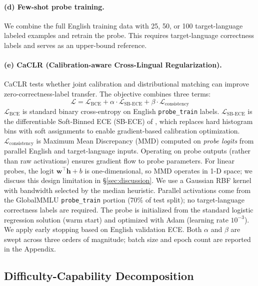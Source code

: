 \paragraph{(d) Few-shot probe training.} We combine the full English training data with 25, 50, or 100 target-language labeled examples and retrain the probe. This requires target-language correctness labels and serves as an upper-bound reference.

\paragraph{(e) CaCLR (Calibration-aware Cross-Lingual Regularization).} CaCLR tests whether joint calibration and distributional matching can improve zero-correctness-label transfer. The objective combines three terms:
\begin{equation}
  \mathcal{L} = \mathcal{L}_{\text{BCE}} + \alpha \cdot \mathcal{L}_{\text{SB-ECE}} + \beta \cdot \mathcal{L}_{\text{consistency}}
  \label{eq:caclr}
\end{equation}
$\mathcal{L}_{\text{BCE}}$ is standard binary cross-entropy on English \texttt{probe\_train} labels. $\mathcal{L}_{\text{SB-ECE}}$ is the differentiable Soft-Binned ECE (SB-ECE) of \citet{karandikar2021sbece}, which replaces hard histogram bins with soft assignments to enable gradient-based calibration optimization. $\mathcal{L}_{\text{consistency}}$ is Maximum Mean Discrepancy (MMD) computed on \emph{probe logits} from parallel English and target-language inputs. Operating on probe outputs (rather than raw activations) ensures gradient flow to probe parameters. For linear probes, the logit $\mathbf{w}^\top \mathbf{h} + b$ is one-dimensional, so MMD operates in 1-D space; we discuss this design limitation in \S\ref{sec:discussion}. We use a Gaussian RBF kernel with bandwidth selected by the median heuristic. Parallel activations come from the GlobalMMLU \texttt{probe\_train} portion (70\% of test split); no target-language correctness labels are required. The probe is initialized from the standard logistic regression solution (warm start) and optimized with Adam (learning rate $10^{-3}$). We apply early stopping based on English validation ECE. Both $\alpha$ and $\beta$ are swept across three orders of magnitude; batch size and epoch count are reported in the Appendix.

\subsection{Difficulty-Capability Decomposition}
\label{sec:decomposition}

